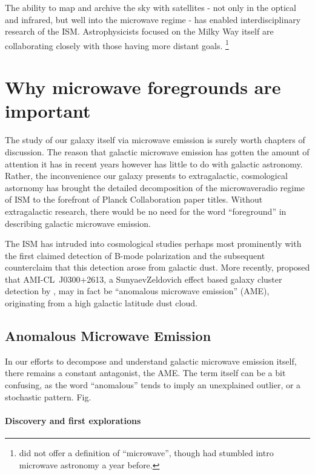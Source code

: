   The ability to map and archive the sky with satellites - not only in the optical and infrared, but well into the microwave regime - has enabled interdisciplinary research of the ISM. Astrophysicists focused on the Milky Way itself are collaborating closely with those having more distant goals. \footnote{\cite{johnson66} did not offer a definition of ``microwave'', though \cite{penzias65} had stumbled intro microwave astronomy a year before. }

\section{Why microwave foregrounds are important}

    The study of our galaxy itself via microwave emission is surely worth chapters of discussion. The reason that galactic microwave emission has gotten the amount of attention it has in recent years however has little to do with galactic astronomy. Rather, the inconvenience our galaxy presents to extragalactic, cosmological astornomy has brought the detailed decomposition of the microwave\-radio regime of ISM to the forefront of Planck Collaboration paper titles. Without extragalactic research, there would be no need for the word ``foreground'' in describing galactic microwave emission.

    The ISM has intruded into cosmological studies perhaps most prominently with the first claimed detection of B-mode polarization \citep{hanson13, bicep214, flauger14} and the subsequent counter\-claim that this detection arose from galactic dust. More recently, \cite{perrott18} proposed that AMI-CL~J0300+2613, a Sunyaev\-Zeldovich effect based galaxy cluster detection  by \cite{shimwell12}, may in fact be ``anomalous microwave emission'' (AME), originating from a high galactic latitude dust cloud.

  \subsection{Anomalous Microwave Emission}

      In our efforts to decompose and understand galactic microwave emission itself, there remains a constant antagonist, the AME. The term itself can be a bit confusing, as the word ``anomalous'' tends to imply an unexplained outlier, or a stochastic pattern. Fig.

    \paragraph{Discovery and first explorations}

